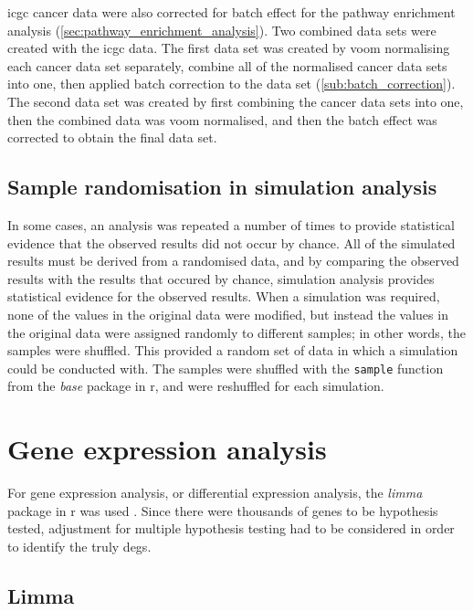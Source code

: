 \gls{icgc} cancer data were also corrected for batch effect for the pathway enrichment analysis (\cref{sec:pathway_enrichment_analysis}).
Two combined data sets were created with the \gls{icgc} data.
The first data set was created by voom normalising each cancer data set separately, combine all of the normalised cancer data sets into one, then applied batch correction to the data set (\cref{sub:batch_correction}).
The second data set was created by first combining the cancer data sets into one, then the combined data was voom normalised, and then the batch effect was corrected to obtain the final data set.

\subsection{Sample randomisation in simulation analysis}
\label{sub:sample_randomisation_in_simulation_analysis}

In some cases, an analysis was repeated a number of times to provide statistical evidence that the observed results did not occur by chance.
All of the simulated results must be derived from a randomised data, and by comparing the observed results with the results that occured by chance, simulation analysis provides statistical evidence for the observed results.
When a simulation was required, none of the values in the original data were modified, but instead the values in the original data were assigned randomly to different samples; in other words, the samples were shuffled.
This provided a random set of data in which a simulation could be conducted with.
The samples were shuffled with the \texttt{sample} function from the \textit{base} package in \gls{r}, and were reshuffled for each simulation.

\section{Gene expression analysis}
\label{sec:gene_expression_analysis}

For gene expression analysis, or differential expression analysis, the \textit{limma} package in \gls{r} was used \citep{Ritchie2015}.
Since there were thousands of genes to be hypothesis tested, adjustment for multiple hypothesis testing had to be considered in order to identify the truly \glspl{deg}.

\subsection{Limma}
\label{sub:limma}

